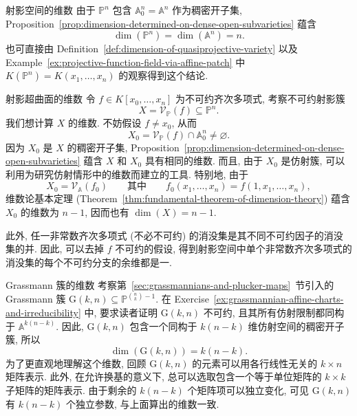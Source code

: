 \begin{Example}{射影空间的维数}\leavevmode\label{ex:dimension-of-projective-space}
由于 $\mathbb{P}^{n}$ 包含 $\mathbb{A}^{n}_{0}=\mathbb{A}^{n}$ 作为稠密开子集, Proposition~\ref{prop:dimension-determined-on-dense-open-subvarieties} 蕴含
\[
  \dim(\mathbb{P}^{n})=\dim(\mathbb{A}^{n})=n.
\]
也可直接由 Definition~\ref{def:dimension-of-quasiprojective-variety} 以及 Example~\ref{ex:projective-function-field-via-affine-patch} 中 $K(\mathbb{P}^{n})=K(x_{1},\ldots,x_{n})$ 的观察得到这个结论.
\end{Example}

\begin{Example}{射影超曲面的维数}\leavevmode\label{ex:dimension-of-projective-hypersurfaces}
令 $f\in K[x_{0},\ldots,x_{n}]$ 为不可约齐次多项式, 考察不可约射影簇
\[
  X=\mathcal{V}_{\mathbb{P}}(f)\subseteq\mathbb{P}^{n}.
\]
我们想计算 $X$ 的维数. 不妨假设 $f\ne x_{0}$, 从而
\[
  X_{0}=\mathcal{V}_{\mathbb{P}}(f)\cap\mathbb{A}^{n}_{0}\ne\varnothing.
\]
因为 $X_{0}$ 是 $X$ 的稠密开子集, Proposition~\ref{prop:dimension-determined-on-dense-open-subvarieties} 蕴含 $X$ 和 $X_{0}$ 具有相同的维数. 而且, 由于 $X_{0}$ 是仿射簇, 可以利用为研究仿射情形中的维数而建立的工具. 特别地, 由于
\[
  X_{0}=\mathcal{V}_{\mathbb{A}}(f_{0})
  \qquad\text{其中}\qquad
  f_{0}(x_{1},\ldots,x_{n})=f(1,x_{1},\ldots,x_{n}),
\]
维数论基本定理 (Theorem~\ref{thm:fundamental-theorem-of-dimension-theory}) 蕴含 $X_{0}$ 的维数为 $n-1$, 因而也有 $\dim(X)=n-1$.

此外, 任一非常数齐次多项式 (不必不可约) 的消没集是其不同不可约因子的消没集的并. 因此, 可以去掉 $f$ 不可约的假设, 得到射影空间中单个非常数齐次多项式的消没集的每个不可约分支的余维都是一.
\end{Example}

\begin{Example}{Grassmann 簇的维数}\leavevmode\label{ex:dimension-of-grassmannians}
考察第~\ref{sec:grassmannians-and-plucker-maps}~节引入的 Grassmann 簇 $\mathrm{G}(k,n)\subseteq\mathbb{P}^{\binom{n}{k}-1}$. 在 Exercise~\ref{ex:grassmannian-affine-charts-and-irreducibility} 中, 要求读者证明 $\mathrm{G}(k,n)$ 不可约, 且其所有仿射限制都同构于 $\mathbb{A}^{k(n-k)}$. 因此, $\mathrm{G}(k,n)$ 包含一个同构于 $k(n-k)$ 维仿射空间的稠密开子簇, 所以
\[
  \dim(\mathrm{G}(k,n))=k(n-k).
\]
为了更直观地理解这个维数, 回顾 $\mathrm{G}(k,n)$ 的元素可以用各行线性无关的 $k\times n$ 矩阵表示. 此外, 在允许换基的意义下, 总可以选取包含一个等于单位矩阵的 $k\times k$ 子矩阵的矩阵表示. 由于剩余的 $k(n-k)$ 个矩阵项可以独立变化, 可见 $\mathrm{G}(k,n)$ 有 $k(n-k)$ 个独立参数, 与上面算出的维数一致.
\end{Example}

